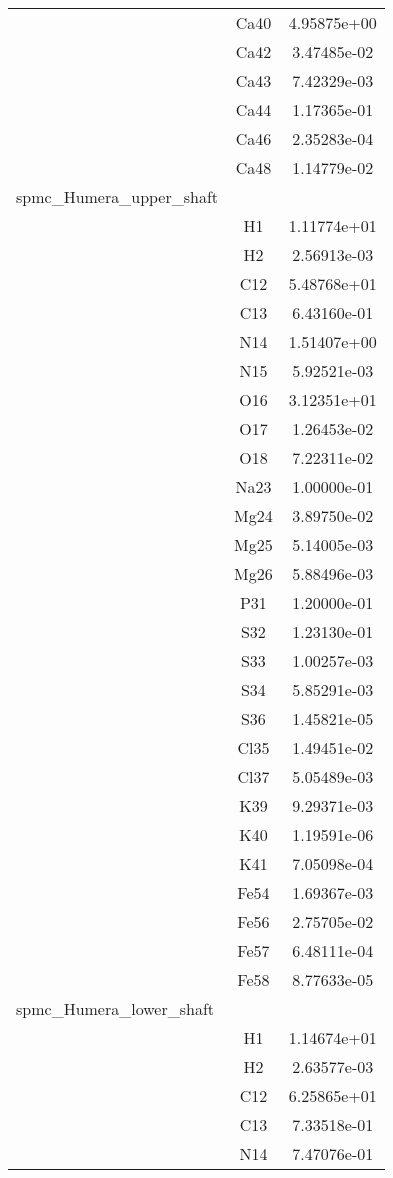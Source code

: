 \begin{centering}
\begin{longtable}{l c c}
& Ca40 & 4.95875e+00 \\ 
& Ca42 & 3.47485e-02 \\ 
& Ca43 & 7.42329e-03 \\ 
& Ca44 & 1.17365e-01 \\ 
& Ca46 & 2.35283e-04 \\ 
& Ca48 & 1.14779e-02 \\ 
\hline
spmc\_Humera\_upper\_shaft & & \\
\hline
& H1 & 1.11774e+01 \\ 
& H2 & 2.56913e-03 \\ 
& C12 & 5.48768e+01 \\ 
& C13 & 6.43160e-01 \\ 
& N14 & 1.51407e+00 \\ 
& N15 & 5.92521e-03 \\ 
& O16 & 3.12351e+01 \\ 
& O17 & 1.26453e-02 \\ 
& O18 & 7.22311e-02 \\ 
& Na23 & 1.00000e-01 \\ 
& Mg24 & 3.89750e-02 \\ 
& Mg25 & 5.14005e-03 \\ 
& Mg26 & 5.88496e-03 \\ 
& P31 & 1.20000e-01 \\ 
& S32 & 1.23130e-01 \\ 
& S33 & 1.00257e-03 \\ 
& S34 & 5.85291e-03 \\ 
& S36 & 1.45821e-05 \\ 
& Cl35 & 1.49451e-02 \\ 
& Cl37 & 5.05489e-03 \\ 
& K39 & 9.29371e-03 \\ 
& K40 & 1.19591e-06 \\ 
& K41 & 7.05098e-04 \\ 
& Fe54 & 1.69367e-03 \\ 
& Fe56 & 2.75705e-02 \\ 
& Fe57 & 6.48111e-04 \\ 
& Fe58 & 8.77633e-05 \\ 
\hline
spmc\_Humera\_lower\_shaft & & \\
\hline
& H1 & 1.14674e+01 \\ 
& H2 & 2.63577e-03 \\ 
& C12 & 6.25865e+01 \\ 
& C13 & 7.33518e-01 \\ 
& N14 & 7.47076e-01 \\ 

\end{longtable}
\end{centering}

